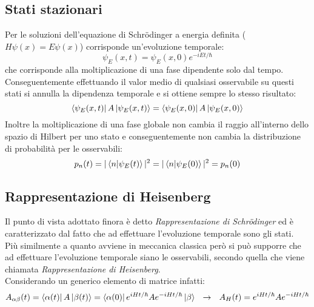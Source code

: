 \documentclass[twoside]{article}
\begin{document}
\vspace{0.5cm}

\subsection{Stati stazionari}
Per le soluzioni dell'equazione di Schr\"odinger a energia definita ($H\psi(x) = E\psi(x)$) corrisponde un'evoluzione temporale:
\begin{equation}
    \psi_E (x,t)=\psi_E (x,0)e^{-iEt/\hbar}
\end{equation}
che corrisponde alla moltiplicazione di una fase dipendente solo dal tempo. Conseguentemente effettuando il valor medio di qualsiasi osservabile su questi stati si annulla la dipendenza temporale e si ottiene sempre lo stesso risultato:
\begin{equation}
    \bra{\psi_E (x,t)}A\ket{\psi_E (x,t)}=\bra{\psi_E (x,0)}A\ket{\psi_E (x,0)}
\end{equation}
Inoltre la moltiplicazione di una fase globale non cambia il raggio all'interno dello spazio di Hilbert per uno stato e conseguentemente non cambia la distribuzione di probabilità per le osservabili:
\begin{equation}
    p_n (t) = |\bra{n}\ket{\psi_E (t)}|^2=|\bra{n}\ket{\psi_E (0)}|^2=p_n (0)
\end{equation}


\subsection{Rappresentazione di Heisenberg}
Il punto di vista adottato finora è detto \textit{Rappresentazione di Schr\"odinger} ed è caratterizzato dal fatto che ad effettuare l'evoluzione temporale sono gli stati.\\
Più similmente a quanto avviene in meccanica classica però si può supporre che ad effettuare l'evoluzione temporale siano le osservabili, secondo quella che viene chiamata \textit{Rappresentazione di Heisenberg}.\\
Considerando un generico elemento di matrice infatti:
\begin{equation}
    A_{\alpha \beta}(t)=\bra{\alpha (t)}A\ket{\beta (t)}=\bra{\alpha (0)}e^{iHt/\hbar}Ae^{-iHt/\hbar}\ket{\beta} \ \ \rightarrow \ \ A_H (t) = e^{iHt/\hbar}Ae^{-iHt/\hbar}
\end{equation}
\end{document}
